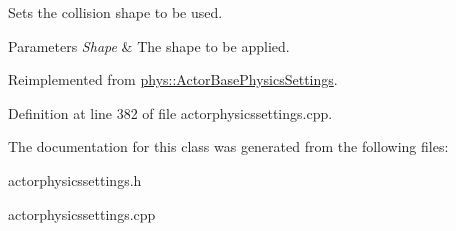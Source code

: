 Sets the collision shape to be used. 


\begin{DoxyParams}{Parameters}
{\em Shape} & The shape to be applied. \\
\hline
\end{DoxyParams}


Reimplemented from \hyperlink{classphys_1_1ActorBasePhysicsSettings_a1509c654724bcb6499ec1e5058ab5185}{phys::ActorBasePhysicsSettings}.



Definition at line 382 of file actorphysicssettings.cpp.



The documentation for this class was generated from the following files:\begin{DoxyCompactItemize}
\item 
actorphysicssettings.h\item 
actorphysicssettings.cpp\end{DoxyCompactItemize}
